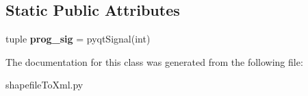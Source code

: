 \subsection*{Static Public Attributes}
\begin{DoxyCompactItemize}
\item 
\hypertarget{class_sim_g_d_c_1_1shapefile_to_xml_1_1_shapefile_to_xml_a2ad74bf7d4a169253b742a1d0da07f7c}{}tuple {\bfseries prog\+\_\+sig} = pyqt\+Signal(int)\label{class_sim_g_d_c_1_1shapefile_to_xml_1_1_shapefile_to_xml_a2ad74bf7d4a169253b742a1d0da07f7c}

\end{DoxyCompactItemize}


The documentation for this class was generated from the following file\+:\begin{DoxyCompactItemize}
\item 
shapefile\+To\+Xml.\+py\end{DoxyCompactItemize}
